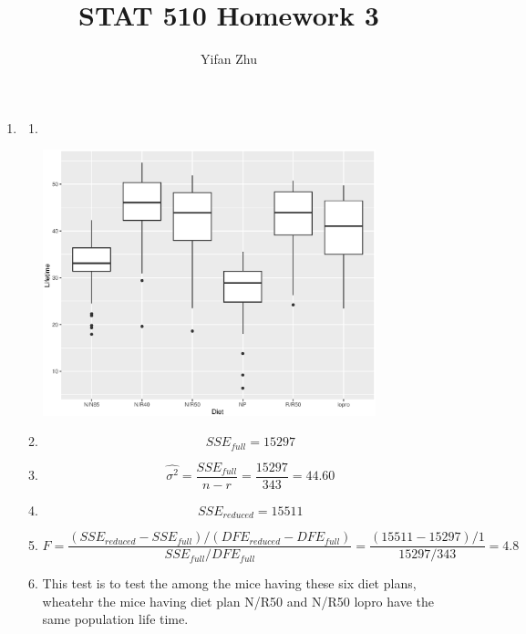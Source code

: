 \documentclass{article}
\begin{document}
	\setcounter{MaxMatrixCols}{20}
	

	
	\title{STAT 510 Homework 3}
	\author{Yifan Zhu}
	\maketitle
	
	\begin{enumerate}[leftmargin = 0 em, label = \arabic*., font = \bfseries]
	\item 
	\begin{enumerate}
		\item \ 

		\begin{center}
		\includegraphics[width = 0.8\textwidth]{boxplot1.eps}
		\end{center}

		\item 
		\[SSE_{full} = 15297\]

		\item 
		\[\hat{\sigma^2} = {\frac{SSE_{full}}{n-r}} = {\frac{15297}{343}} = 44.60\]

		\item 
		\[SSE_{reduced} = 15511\]

		\item 
		\[F = \frac{(SSE_{reduced} - SSE_{full})/(DFE_{reduced} - DFE_{full})}{SSE_{full}/DFE_{full}} = \frac{(15511 - 15297)/1}{15297/343} = 4.8\]

		\item 
		This test is to test the among the mice having these six diet plans,  wheatehr the mice having diet plan N/R50 and N/R50 lopro have the same population life time. 


\end{enumerate}
\end{enumerate}
\end{document}
